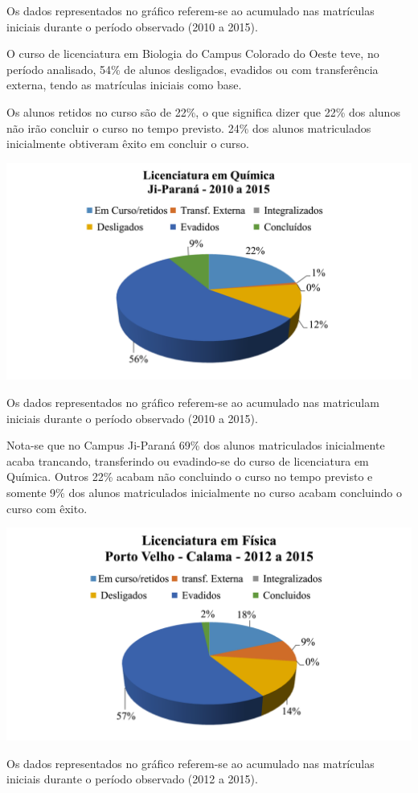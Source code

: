 \documentclass[article,12pt,onesidea,4paper,english,brazil]{abntex2}
\begin{document}
	Os dados representados no gráfico referem-se ao acumulado nas matrículas iniciais durante o
	período observado (2010 a 2015).
	
	O curso de licenciatura em Biologia do Campus Colorado do Oeste teve, no período
	analisado, 54\% de alunos desligados, evadidos ou com transferência externa, tendo as matrículas
	iniciais como base.
	
	Os alunos retidos no curso são de 22\%, o que significa dizer que 22\% dos alunos não irão
	concluir o curso no tempo previsto. 24\% dos alunos matriculados inicialmente obtiveram êxito
	em concluir o curso.
	\begin{center}
		\includegraphics[width=0.7\linewidth]{pip-97-11}
	\end{center}
	
	Os dados representados no gráfico referem-se ao acumulado nas matriculam iniciais
	durante o período observado (2010 a 2015).
	
	Nota-se que no Campus Ji-Paraná 69\% dos alunos matriculados inicialmente acaba
	trancando, transferindo ou evadindo-se do curso de licenciatura em Química. Outros 22\% acabam
	não concluindo o curso no tempo previsto e somente 9\% dos alunos matriculados inicialmente no
	curso acabam concluindo o curso com êxito.
	\begin{center}
		\includegraphics[width=0.7\linewidth]{pip-97-12}
	\end{center}
	
	Os dados representados no gráfico referem-se ao acumulado nas matrículas iniciais durante o
	período observado (2012 a 2015).
	
\end{document}
